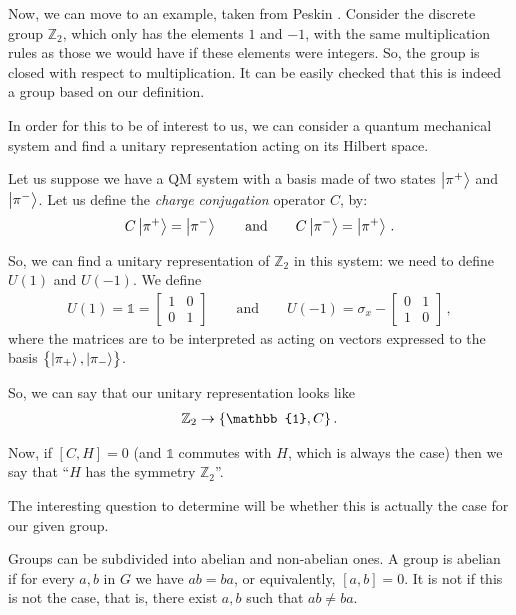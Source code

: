 \documentclass[main.tex]{subfiles}
\begin{document}
Now, we can move to an example, taken from Peskin \cite[]{peskinConceptsElementaryParticle2019}. 
Consider the discrete group \(\mathbb{Z}_{2}\), which only has the elements \(1\) and \(-1\), with the same multiplication rules as those we would have if these elements were integers. 
So, the group is closed with respect to multiplication.
It can be easily checked that this is indeed a group based on our definition. 

In order for this to be of interest to us, we can consider a quantum mechanical system and find a unitary representation acting on its Hilbert space. 

Let us suppose we have a QM system with a basis made of two states \(\ket{\pi^{+}}\) and \(\ket{\pi^{-}}\). Let us define the \emph{charge conjugation} operator \(C\), by: 
%
\begin{align}
C \ket{\pi^{+}} = \ket{\pi^{-}} 
\qquad \text{and} \qquad
C \ket{\pi^{-}} = \ket{\pi^{+}} 
\,.
\end{align}

So, we can find a unitary representation of \(\mathbb{Z}_{2}\) in this system: we need to define \(U(1)\) and \(U(-1)\). We define 
%
\begin{align}
U(1) = \mathbb{1} =\left[\begin{array}{cc}
1 & 0 \\ 
0 & 1
\end{array}\right] 
\qquad \text{and} \qquad
U(-1) = \sigma_{x} - \left[\begin{array}{cc}
0 & 1 \\ 
1 & 0
\end{array}\right]
\,,
\end{align}
%
where the matrices are to be interpreted as acting on vectors expressed to the basis \(\qty{\ket{\pi_{+}}, \ket{\pi_{-}}}\).

So, we can say that our unitary representation looks like 
%
\begin{align}
\mathbb{Z}_{2} \rightarrow \qty{\mathbb{1}, C}
\,.
\end{align}

Now, if \([C, H] =0\) (and \(\mathbb{1}\) commutes with \(H\), which is always the case) then we say that ``\(H\) has the symmetry \(\mathbb{Z}_{2}\)''.

The interesting question to determine will be whether this is actually the case for our given group. 

Groups can be subdivided into abelian and non-abelian ones.
A group is abelian if for every \(a, b\) in \(G\) we have \(ab = ba\), or equivalently, \([a, b] =0\). 
It is not if this is not the case, that is, there exist \(a, b\) such that \(ab \neq ba\). 
\end{document}
